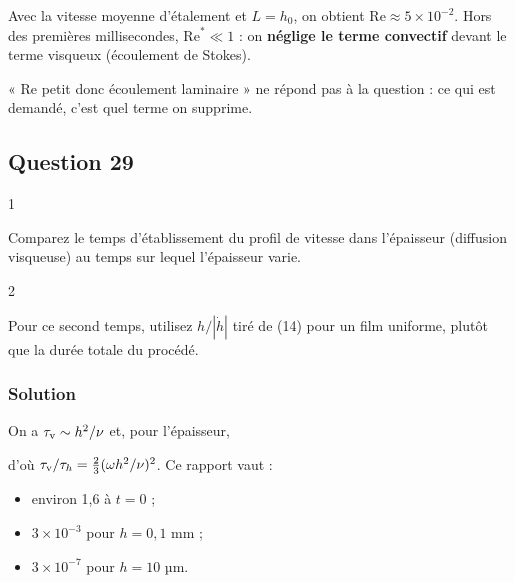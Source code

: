 \documentclass[11pt,a4paper]{article}
\providecommand{\tightlist}{\setlength{\itemsep}{0pt}\setlength{\parskip}{0pt}}
\newcommand{\equationajustee}[1]{%
  \sbox{\boiteequation}{$\displaystyle #1$}%
  \ifdim\wd\boiteequation>\linewidth
    \[\resizebox{\linewidth}{!}{\usebox{\boiteequation}}\]%
  \else
    \[#1\]%
  \fi}
\begin{document}
Avec la vitesse moyenne d'étalement et \(L=h_0\), on obtient \(\text{Re}\approx5\times10^{-2}\). Hors des premières millisecondes, \(\text{Re}^*\ll1\) : on \textbf{néglige le terme convectif} devant le terme visqueux (écoulement de Stokes).

\begin{piege}

« Re petit donc écoulement laminaire » ne répond pas à la question : ce qui est demandé, c'est quel terme on supprime.

\end{piege}

\hypertarget{question-29}{%
\subsection{Question 29}\label{question-29}}

\begin{indication}{1}

Comparez le temps d'établissement du profil de vitesse dans l'épaisseur (diffusion visqueuse) au temps sur lequel l'épaisseur varie.

\end{indication}

\begin{indication}{2}

Pour ce second temps, utilisez \(h/|\dot h|\) tiré de (14) pour un film uniforme, plutôt que la durée totale du procédé.

\end{indication}

\hypertarget{solution-28}{%
\subsubsection{Solution}\label{solution-28}}

On a \(\tau_\text v\sim h^2/\nu\) et, pour l'épaisseur,

\equationajustee{\begin{aligned}
\tau_h&=\frac{h}{|\dot h|}\\
&=\frac{3\eta}{2\mu\omega^2h^2},
\end{aligned}}

d'où \(\tau_\text v/\tau_h=\tfrac23(\omega h^2/\nu)^2\). Ce rapport vaut :

\begin{itemize}
\tightlist
\item
  environ 1,6 à \(t=0\) ;
\item
  \(3\times10^{-3}\) pour \(h=0{,}1\) mm ;
\item
  \(3\times10^{-7}\) pour \(h=10\) µm.
\end{itemize}
\end{document}
